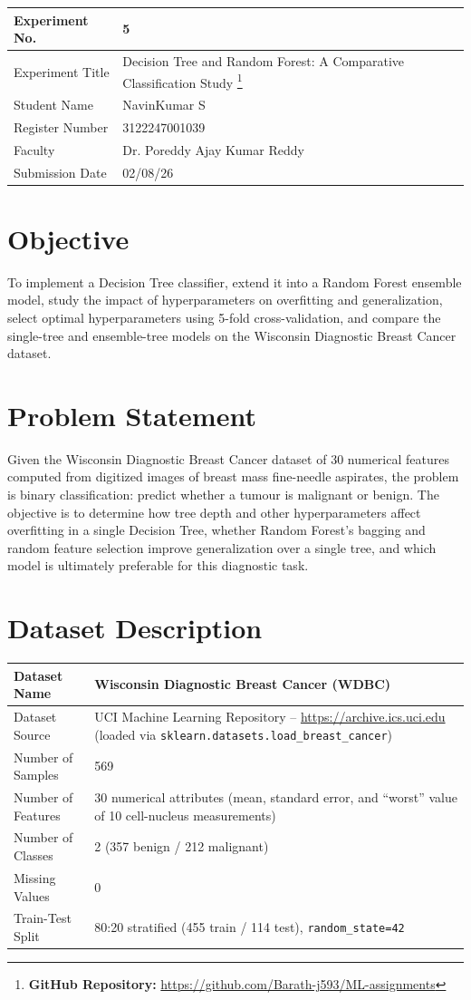 \documentclass[12pt,a4paper]{article}
\begin{document}
\begin{tabular}{|p{4cm}|p{11cm}|}
\hline
Experiment No. & 5 \\ \hline
Experiment Title & Decision Tree and Random Forest: A Comparative Classification Study
\footnote{\textbf{GitHub Repository: }\url{https://github.com/Barath-j593/ML-assignments}}\\ \hline
Student Name & NavinKumar S \\ \hline
Register Number & 3122247001039 \\ \hline
Faculty & Dr. Poreddy Ajay Kumar Reddy \\ \hline
Submission Date & 02/08/26 \\ \hline
\end{tabular}

\section{Objective}
To implement a Decision Tree classifier, extend it into a Random Forest ensemble model,
study the impact of hyperparameters on overfitting and generalization, select optimal
hyperparameters using 5-fold cross-validation, and compare the single-tree and ensemble-tree
models on the Wisconsin Diagnostic Breast Cancer dataset.

\section{Problem Statement}
Given the Wisconsin Diagnostic Breast Cancer dataset of 30 numerical features computed from
digitized images of breast mass fine-needle aspirates, the problem is binary classification:
predict whether a tumour is malignant or benign. The objective is to determine how tree depth
and other hyperparameters affect overfitting in a single Decision Tree, whether Random
Forest's bagging and random feature selection improve generalization over a single tree, and
which model is ultimately preferable for this diagnostic task.

\section{Dataset Description}
\begin{longtable}{|p{6cm}|p{8cm}|}
\hline
Dataset Name & Wisconsin Diagnostic Breast Cancer (WDBC) \\ \hline
Dataset Source & UCI Machine Learning Repository -- \url{https://archive.ics.uci.edu} (loaded via \texttt{sklearn.datasets.load\_breast\_cancer}) \\ \hline
Number of Samples & 569 \\ \hline
Number of Features & 30 numerical attributes (mean, standard error, and ``worst'' value of 10 cell-nucleus measurements) \\ \hline
Number of Classes & 2 (357 benign / 212 malignant) \\ \hline
Missing Values & 0 \\ \hline
Train-Test Split & 80:20 stratified (455 train / 114 test), \texttt{random\_state=42} \\ \hline
\end{longtable}
\end{document}
